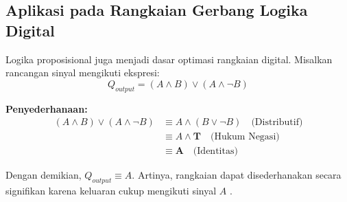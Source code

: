 \subsection{Aplikasi pada Rangkaian Gerbang Logika Digital}

Logika proposisional juga menjadi dasar optimasi rangkaian digital. Misalkan rancangan sinyal mengikuti ekspresi:
$$ Q_{output} = (A \land B) \lor (A \land \neg B) $$

\textbf{Penyederhanaan:}
\begin{align*}
    (A \wedge B) \vee (A \wedge \neg B) &\equiv A \wedge (B \vee \neg B) \quad \text{(Distributif)} \\
    &\equiv A \wedge \mathbf{T} \quad \text{(Hukum Negasi)} \\
    &\equiv \mathbf{A} \quad \text{(Identitas)}
\end{align*}

Dengan demikian, $Q_{output} \equiv A$. Artinya, rangkaian dapat disederhanakan secara signifikan karena keluaran cukup mengikuti sinyal $A$ \cite{wiki_proplogic}.
